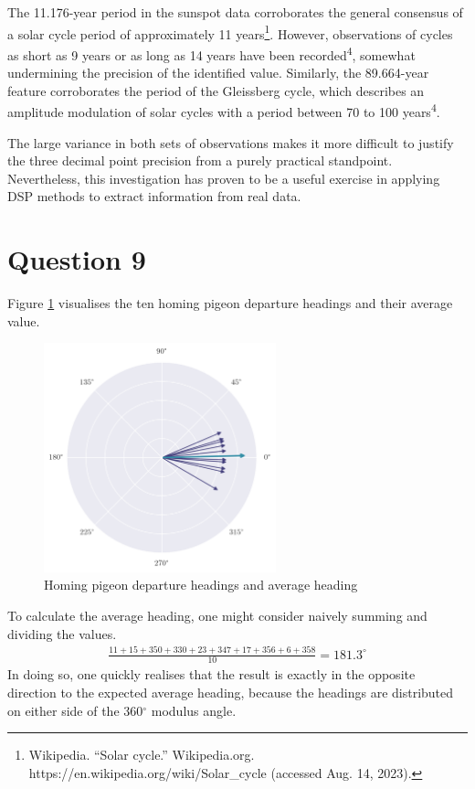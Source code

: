 \documentclass[a4paper, 11pt]{article}
\begin{document}
The 11.176-year period in the sunspot data corroborates the general consensus
of a solar cycle period of approximately 11 years\footnote{Wikipedia. ``Solar
cycle.'' Wikipedia.org. https://en.wikipedia.org/wiki/Solar\_cycle (accessed
Aug. 14, 2023).}. However, observations of cycles as short as 9 years or as
long as 14 years have been recorded\textsuperscript{4}, somewhat undermining
the precision of the identified value. Similarly, the 89.664-year feature
corroborates the period of the Gleissberg cycle, which describes an amplitude
modulation of solar cycles with a period between 70 to 100
years\textsuperscript{4}.

The large variance in both sets of observations makes it more difficult to
justify the three decimal point precision from a purely practical standpoint.
Nevertheless, this investigation has proven to be a useful exercise in
applying DSP methods to extract information from real data.

\newpage
\section*{Question 9}

Figure \ref{fig:q9_headings} visualises the ten homing pigeon departure headings
and their average value.

\begin{figure}[ht]
    \centering
    \includegraphics[width=0.6\textwidth]{images/q9_headings.png}
    \caption{Homing pigeon departure headings and average heading}
    \label{fig:q9_headings}
\end{figure}

To calculate the average heading, one might consider naively summing and
dividing the values.
\begin{align*}
    \frac{11+15+350+330+23+347+17+356+6+358}{10} = 181.3^\circ
\end{align*}
In doing so, one quickly realises that the result is exactly in the opposite
direction to the expected average heading, because the headings are distributed
on either side of the 360$^\circ$ modulus angle.
\end{document}
